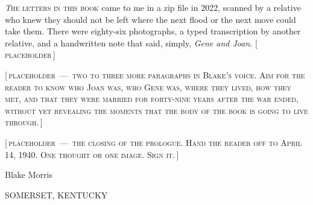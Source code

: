 %
%

\cleardoublepage
\thispagestyle{laempty}
\vspace*{0.10\textheight}
\begin{center}
    \par
    \vspace{0.6em}
    \brassrule[36pt]\par
\end{center}
\vspace{2em}

\noindent
%

\lettrine[lines=3, slope=0pt, findent=-0.2em, nindent=0pt]
{\displayfont\itshape T}{he letters in this book}
came to me in a zip file in 2022, scanned by a relative who knew
they should not be left where the next flood or the next move could
take them. There were eighty-six photographs, a typed transcription
by another relative, and a handwritten note that said, simply,
\emph{Gene and Joan}. \textsc{[\,placeholder\,]}

\vspace{0.6em}

\noindent
\textsc{[\,placeholder \,---\, two to three more paragraphs in Blake's voice. Aim for the
reader to know who Joan was, who Gene was, where they lived, how
they met, and that they were married for forty-nine years after
the war ended, without yet revealing the moments that the body of
the book is going to live through.\,]}

\vspace{0.6em}

\noindent
\textsc{[\,placeholder \,---\, the closing of the prologue. Hand the reader off to
April 14, 1940. One thought or one image. Sign it.\,]}

\vspace{2em}
\begin{flushright}
    {\handfont\Large Blake Morris}\par
    \vspace{0.2em}
    {\monofont\footnotesize\color{walnutmute}
        SOMERSET, KENTUCKY \, \textbf{\textperiodcentered} \, \the\year}
\end{flushright}
\vfill
